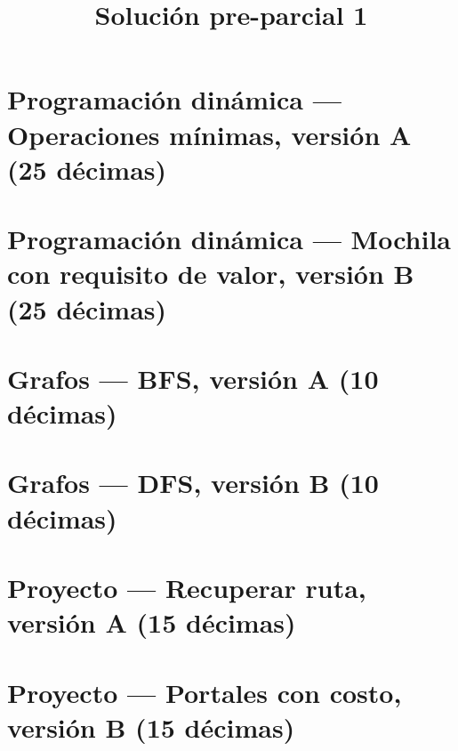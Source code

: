 \documentclass{doc}
\title{Solución pre-parcial 1}
\begin{document}
\makedocheader

\section{Programación dinámica --- Operaciones mínimas, versión A (25 décimas)}


\section{Programación dinámica --- Mochila con requisito de valor, versión B (25 décimas)}


\section{Grafos --- BFS, versión A (10 décimas)}


\section{Grafos --- DFS, versión B (10 décimas)}


\section{Proyecto --- Recuperar ruta, versión A (15 décimas)}


\section{Proyecto --- Portales con costo, versión B (15 décimas)}

\end{document}
